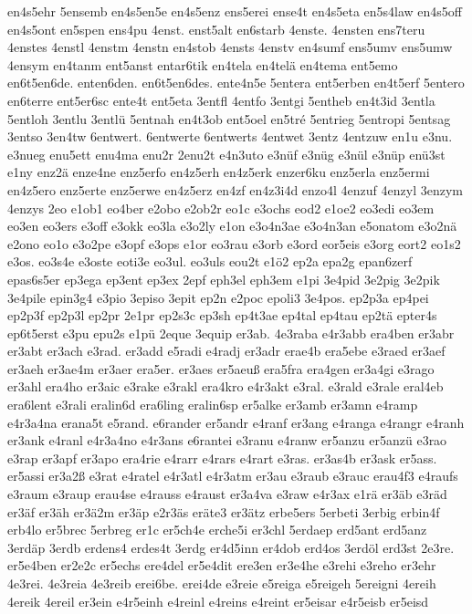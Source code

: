 {en4s5ehr
5ensemb
en4s5en5e
en4s5enz
ens5erei
ense4t
en4s5eta
en5s4law
en4s5off
en4s5ont
en5spen
ens4pu
4enst.
enst5alt
en6starb
4enste.
4ensten
ens7teru
4enstes
4enstl
4enstm
4enstn
en4stob
4ensts
4enstv
en4sumf
ens5umv
ens5umw
4ensym
en4tanm
ent5anst
entar6tik
en4tela
en4telä
en4tema
ent5emo
en6t5en6de.
enten6den.
en6t5en6des.
ente4n5e
5entera
ent5erben
en4t5erf
5entero
en6terre
ent5er6sc
ente4t
ent5eta
3entfl
4entfo
3entgi
5entheb
en4t3id
3entla
5entloh
3entlu
3entlü
5entnah
en4t3ob
ent5oel
en5tré
5entrieg
5entropi
5entsag
3entso
3en4tw
6entwert.
6entwerte
6entwerts
4entwet
3entz
4entzuw
en1u
e3nu.
e3nueg
enu5ett
enu4ma
enu2r
2enu2t
e4n3uto
e3nüf
e3nüg
e3nül
e3nüp
enü3st
e1ny
enz2ä
enze4ne
enz5erfo
en4z5erh
en4z5erk
enzer6ku
enz5erla
enz5ermi
en4z5ero
enz5erte
enz5erwe
en4z5erz
en4zf
en4z3i4d
enzo4l
4enzuf
4enzyl
3enzym
4enzys
2eo
e1ob1
eo4ber
e2obo
e2ob2r
eo1c
e3ochs
eod2
e1oe2
eo3edi
eo3em
eo3en
eo3ers
e3off
e3okk
eo3la
e3o2ly
e1on
e3o4n3ae
e3o4n3an
e5onatom
e3o2nä
e2ono
eo1o
e3o2pe
e3opf
e3ops
e1or
eo3rau
e3orb
e3ord
eor5eis
e3org
eort2
eo1s2
e3os.
eo3s4e
e3oste
eoti3e
eo3ul.
eo3uls
eou2t
e1ö2
ep2a
epa2g
epan6zerf
epas6s5er
ep3ega
ep3ent
ep3ex
2epf
eph3el
eph3em
e1pi
3e4pid
3e2pig
3e2pik
3e4pile
epin3g4
e3pio
3episo
3epit
ep2n
e2poc
epoli3
3e4pos.
ep2p3a
ep4pei
ep2p3f
ep2p3l
ep2pr
2e1pr
ep2s3c
ep3sh
ep4t3ae
ep4tal
ep4tau
ep2tä
epter4s
ep6t5erst
e3pu
epu2s
e1pü
2eque
3equip
er3ab.
4e3raba
e4r3abb
era4ben
er3abr
er3abt
er3ach
e3rad.
er3add
e5radi
e4radj
er3adr
erae4b
era5ebe
e3raed
er3aef
er3aeh
er3ae4m
er3aer
era5er.
er3aes
er5aeuß
era5fra
era4gen
er3a4gi
e3rago
er3ahl
era4ho
er3aic
e3rake
e3rakl
era4kro
e4r3akt
e3ral.
e3rald
e3rale
eral4eb
era6lent
e3rali
eralin6d
era6ling
eralin6sp
er5alke
er3amb
er3amn
e4ramp
e4r3a4na
erana5t
e5rand.
e6rander
er5andr
e4ranf
er3ang
e4ranga
e4rangr
e4ranh
er3ank
e4ranl
e4r3a4no
e4r3ans
e6rantei
e3ranu
e4ranw
er5anzu
er5anzü
e3rao
e3rap
er3apf
er3apo
era4rie
e4rarr
e4rars
e4rart
e3ras.
er3as4b
er3ask
er5ass.
er5assi
er3a2ß
e3rat
e4ratel
e4r3atl
e4r3atm
er3au
e3raub
e3rauc
erau4f3
e4raufs
e3raum
e3raup
erau4se
e4rauss
e4raust
er3a4va
e3raw
e4r3ax
e1rä
er3äb
e3räd
er3äf
er3äh
er3ä2m
er3äp
e2r3äs
eräte3
er3ätz
erbe5ers
5erbeti
3erbig
erbin4f
erb4lo
er5brec
5erbreg
er1c
er5ch4e
erche5i
er3chl
5erdaep
erd5ant
erd5anz
3erdäp
3erdb
erdens4
erdes4t
3erdg
er4d5inn
er4dob
erd4os
3erdöl
erd3st
2e3re.
er5e4ben
er2e2c
er5echs
ere4del
er5e4dit
ere3en
er3e4he
e3rehi
e3reho
er3ehr
4e3rei.
4e3reia
4e3reib
erei6be.
erei4de
e3reie
e5reiga
e5reigeh
5ereigni
4ereih
4ereik
4ereil
er3ein
e4r5einh
e4reinl
e4reins
e4reint
er5eisar
e4r5eisb
er5eisd
}
